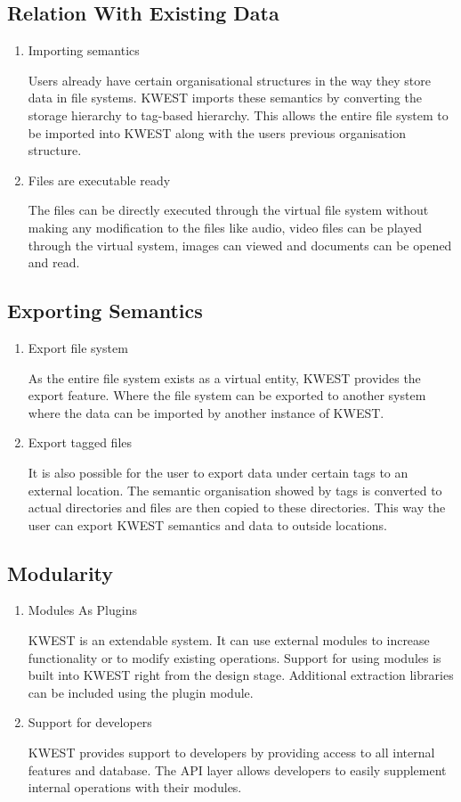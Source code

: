 \subsection{Relation With Existing Data}
\begin{enumerate}
\item Importing semantics 

Users already have certain organisational structures in the way they store data in file systems. KWEST imports these semantics by converting the storage hierarchy to tag-based hierarchy. This allows the entire file system to be imported into KWEST along with the users previous organisation structure. 
\item Files are executable ready 

The files can be directly executed through the virtual file system without making any modification to the files like audio, video files can be played through the virtual system, images can viewed and documents can be opened and read.  
\end{enumerate}

\subsection{Exporting Semantics}
\begin{enumerate}
\item Export file system 

As the entire file system exists as a virtual entity, KWEST provides the export feature. Where the file system can be exported to another system where the data can be imported by another instance of KWEST. 
\item Export tagged files 

It is also possible for the user to export data under certain tags to an external location. The semantic organisation showed by tags is converted to actual directories and files are then copied to these directories. This way the user can export KWEST semantics and data to outside locations.
\end{enumerate}
	
\subsection{Modularity}
\begin{enumerate}
\item Modules As Plugins 

KWEST is an extendable system. It can use external modules to increase functionality or to modify existing operations. Support for using modules is built into KWEST right from the design stage. Additional extraction libraries can be included using the plugin module.
\item Support for developers 

KWEST provides support to developers by providing access to all internal features and database. The API layer allows developers to easily supplement internal operations with their modules.
\end{enumerate}


